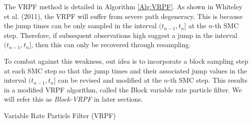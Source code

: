 \documentclass[12pt,a4paper]{article}
\begin{document}
The VRPF method is detailed in Algorithm \ref{Alg:VRPF}. As shown in Whiteley et al. (2011), the VRPF will suffer from severe path degeneracy. This is because the jump times can be only sampled in the interval $(t_{n-1},t_n]$ at the $n$-th SMC step. Therefore, if subsequent observations high suggest a jump in the interval $(t_{n-1},t_n]$, then this can only be recovered through resampling.

To combat against this weakness, out idea is to incorporate a block sampling step at each SMC step so that the jump times and their associated jump values in the interval $(t_{n-1},t_n]$ can be revised and modified at the $n$-th SMC step. This results in a modified VRPF algorithm, called the Block variable rate particle filter. We will refer this as \textit{Block-VRPF} in later sections. 
\begin{algorithm}
    \caption{Variable Rate Particle Filter (VRPF)}
    \label{Alg:VRPF}
\end{algorithm}
    
\end{document}
